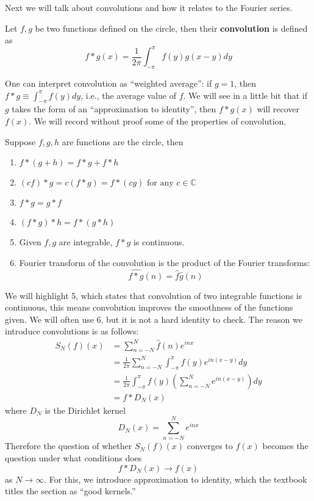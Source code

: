 Next we will talk about convolutions and how it relates to the Fourier series.
\begin{defn}[convolution]
    Let $f,g$ be two functions defined on the circle, then their \textbf{convolution} is defined as 
    \begin{equation*}
        f\ast g(x)=\frac{1}{2\pi}\int_{-\pi}^\pi f(y)g(x-y)dy
    \end{equation*}
\end{defn}
One can interpret convolution as ``weighted average'': if $g=1$, then $f\ast g\equiv\int_{-\pi}^{\pi}f(y)dy$, i.e., the average value of $f$. We will see in a little bit that if $g$ takes the form of an ``approximation to identity'', then $f\ast g(x)$ will recover $f(x)$. We will record without proof some of the properties of convolution.
\begin{prop}
    Suppose $f,g,h$ are functions are the circle, then 
    \begin{enumerate}
        \item $f\ast(g+h)=f\ast g+f\ast h$
        \item $(cf)\ast g=c(f\ast g)=f\ast (cg) \text{ for any } c\in\mathbb{C}$
        \item $f\ast g=g\ast f$
        \item $(f\ast g)\ast h=f\ast(g\ast h)$
        \item Given $f,g$ are integrable, $f\ast g$ is continuous.
        \item Fourier transform of the convolution is the product of the Fourier transforms:
        \begin{equation*}
            \widehat{f\ast g}(n)=\hat{f}\hat{g}(n)
        \end{equation*}
    \end{enumerate}
\end{prop}
We will highlight 5, which states that convolution of two integrable functions is continuous, this means convolution improves the smoothness of the functions given. We will often use 6, but it is not a hard identity to check. The reason we introduce convolutions is as follows:
\begin{align*}
    S_N(f)(x)&=\sum_{n=-N}^N\hat{f}(n)e^{inx}\\
    &=\frac{1}{2\pi}\sum_{n=-N}^N\int_{-\pi}^\pi f(y)e^{in(x-y)}dy\\
    &=\frac{1}{2\pi}\int_{-\pi}^\pi f(y)\left(\sum_{n=-N}^Ne^{in(x-y)}\right)dy\\
    &=f\ast D_N(x)
\end{align*}
where $D_N$ is the Dirichlet kernel
\begin{equation*}
    D_N(x)=\sum_{n=-N}^N e^{inx}
\end{equation*}
Therefore the question of whether $S_N(f)(x)$ converges to $f(x)$ becomes the question under what conditions does 
\begin{equation*}
    f\ast D_N(x)\to f(x)
\end{equation*}
as $N\to\infty$. For this, we introduce approximation to identity, which the textbook titles the section as ``good kernels.''

